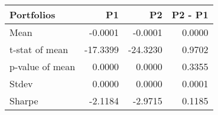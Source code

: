 \begin{tabular}{lrrr}
\toprule
Portfolios & P1 & P2 & P2 - P1 \\
\midrule
Mean & -0.0001 & -0.0001 & 0.0000 \\
t-stat of mean & -17.3399 & -24.3230 & 0.9702 \\
p-value of mean & 0.0000 & 0.0000 & 0.3355 \\
Stdev & 0.0000 & 0.0000 & 0.0001 \\
Sharpe & -2.1184 & -2.9715 & 0.1185 \\
\bottomrule
\end{tabular}

